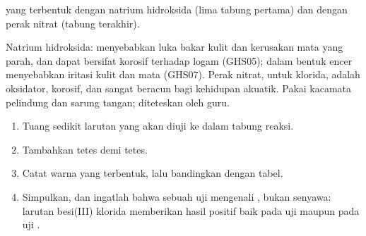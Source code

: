 \begin{omfigure}

{\small {} yang terbentuk dengan natrium hidroksida (lima tabung
pertama) dan dengan perak nitrat (tabung terakhir).}
\end{omfigure}

\begin{safety}{}
Natrium hidroksida: menyebabkan luka bakar kulit dan kerusakan mata yang
parah, dan dapat bersifat korosif terhadap logam (GHS05); dalam bentuk
encer menyebabkan iritasi kulit dan mata (GHS07). Perak nitrat, 
untuk klorida, adalah oksidator, korosif, dan sangat beracun bagi
kehidupan akuatik. Pakai kacamata pelindung dan sarung tangan; 
diteteskan oleh guru.
\end{safety}

\begin{method}\label{met:g9:ions:test}
\begin{enumerate}
  \item Tuang sedikit larutan yang akan diuji ke dalam tabung reaksi.
  \item Tambahkan  tetes demi tetes.
  \item Catat warna  yang terbentuk, lalu bandingkan dengan tabel.
  \item Simpulkan, dan ingatlah bahwa sebuah uji mengenali , bukan
        senyawa: larutan besi(III) klorida memberikan hasil positif baik
        pada uji  maupun pada uji .
\end{enumerate}
\end{method}

